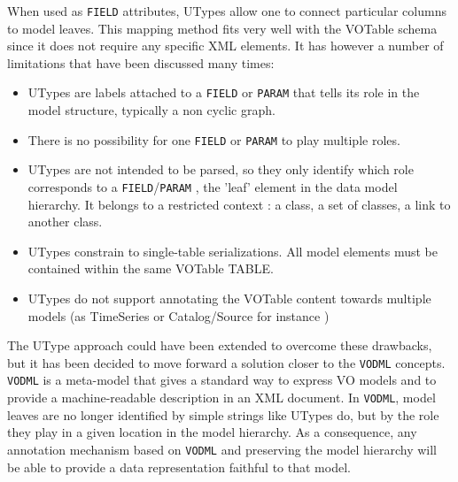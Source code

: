 When used as \texttt{FIELD} attributes, UTypes allow one to connect particular columns to model leaves. This mapping method fits very well with the VOTable schema since it does not require any specific XML elements. It has however a number of limitations that have been discussed many times:

\begin{itemize}
  \item UTypes are labels attached to  a \texttt{FIELD} or \texttt{PARAM} that tells its role in the 
  model structure, typically a non cyclic graph. 
   \item There is no possibility for one  \texttt{FIELD} or \texttt{PARAM} to play multiple roles.
  \item UTypes are not intended to be parsed, so they only identify which role corresponds to a \texttt{FIELD}/\texttt{PARAM} , the 'leaf'  element in the data model hierarchy.
  It belongs to a restricted context : a class, a set of classes, a link to another class.
  \item UTypes constrain to single-table serializations. All model elements must 
  be contained within the same VOTable TABLE.
 
  \item UTypes do not support annotating the VOTable content towards multiple models 
  (as TimeSeries or Catalog/Source for instance )
\end{itemize}

The UType approach could have been extended to overcome these drawbacks, but it has been decided to move forward a solution closer to the \texttt{VODML} \citep{2018ivoa.spec.0910L} concepts. 
 \texttt{VODML} is a meta-model that gives a standard way to express VO models and to provide a machine-readable description in an XML document.
In \texttt{VODML},  model leaves are no longer identified by simple strings like UTypes do, but by the role they play in a given location in the model hierarchy.
As a consequence, any annotation mechanism based on \texttt{VODML} and preserving the model hierarchy will be able  to provide a data representation faithful to that model.

